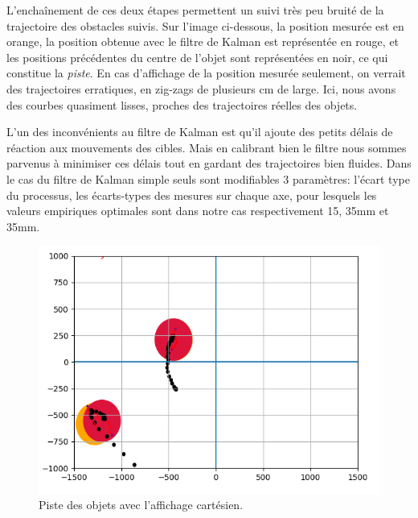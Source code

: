 L'enchaînement de ces deux étapes permettent un suivi très peu bruité de la trajectoire des obstacles suivis. Sur l'image ci-dessous, la position mesurée est en orange, la position obtenue avec le filtre de Kalman est représentée en rouge, et les positions précédentes du centre de l'objet sont représentées en noir, ce qui constitue la \textit{piste}. En cas d'affichage de la position mesurée seulement, on verrait des trajectoires erratiques, en zig-zags de plusieurs cm de large. Ici, nous avons des courbes quasiment lisses, proches des trajectoires réelles des objets.

L'un des inconvénients au filtre de Kalman est qu'il ajoute des petits délais de réaction aux mouvements des cibles. Mais en calibrant bien le filtre nous sommes parvenus à minimiser ces délais tout en gardant des trajectoires bien fluides. Dans le cas du filtre de Kalman simple seuls sont modifiables 3 paramètres: l'écart type du processus, les écarts-types des mesures sur chaque axe, pour lesquels les valeurs empiriques optimales sont dans notre cas respectivement 15, 35mm et 35mm.
\begin{figure}[htp]
    \centering
    \includegraphics[width=14cm]{images/Suivi/piste02.png}
    \caption{Piste des objets avec l'affichage  cartésien.}
\end{figure}